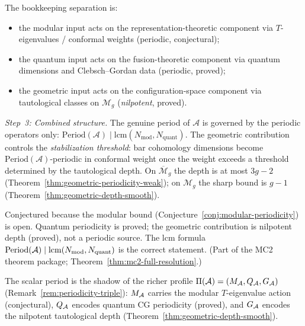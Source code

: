 \begin{evidence}
The bookkeeping separation is:
\begin{itemize}
\item the modular input acts on the representation-theoretic component
  via $T$-eigenvalues / conformal weights (periodic, conjectural);
\item the quantum input acts on the fusion-theoretic component via
  quantum dimensions and Clebsch--Gordan data (periodic, proved);
\item the geometric input acts on the configuration-space component via
  tautological classes on $\mathcal{M}_g$ (\emph{nilpotent}, proved).
\end{itemize}

\emph{Step~3: Combined structure.}
The genuine period of $\mathcal{A}$ is governed by the periodic
operators only:
$\mathrm{Period}(\mathcal{A}) \mid \mathrm{lcm}(N_{\mathrm{mod}},
N_{\mathrm{quant}})$.  The geometric contribution controls
the \emph{stabilization threshold}: bar cohomology dimensions
become $\mathrm{Period}(\mathcal{A})$-periodic in conformal weight
once the weight exceeds a threshold determined by the tautological
depth.  On $\overline{\mathcal{M}}_g$ the depth is at most $3g-2$
(Theorem~\ref{thm:geometric-periodicity-weak}); on $\mathcal{M}_g$
the sharp bound is $g-1$
(Theorem~\ref{thm:geometric-depth-smooth}).
\end{evidence}

\begin{remark}[Scope]\label{rem:periodicity-classification-scope}
Conjectured because the modular bound
(Conjecture~\ref{conj:modular-periodicity}) is open.  Quantum
periodicity is proved; the geometric contribution is nilpotent depth
(proved), not a periodic source.  The lcm formula
$\mathrm{Period}(\mathcal{A}) \mid
\mathrm{lcm}(N_{\mathrm{mod}}, N_{\mathrm{quant}})$ is the correct
statement.
(Part of the MC2 theorem package; Theorem~\ref{thm:mc2-full-resolution}.)
\end{remark}

\begin{remark}\label{rem:periodicity-triple-deformation}
The scalar period is the shadow of the richer profile
$\Pi(\mathcal{A}) = (M_{\mathcal{A}}, Q_{\mathcal{A}}, G_{\mathcal{A}})$
(Remark~\ref{rem:periodicity-triple}):
$M_{\mathcal{A}}$ carries the modular $T$-eigenvalue action (conjectural),
$Q_{\mathcal{A}}$ encodes quantum CG periodicity (proved), and $G_{\mathcal{A}}$
encodes the nilpotent tautological depth
(Theorem~\ref{thm:geometric-depth-smooth}).
\end{remark}

